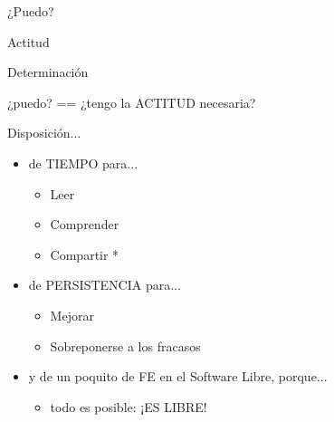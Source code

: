 \documentclass[xcolor=dvipsnames, pdf]{beamer}
\begin{document}
\begin{section}
  {¿Puedo?}
  
  \begin{subsection}
    {Actitud}
    
    \begin{frame}
      {Determinación}
      \begin{center}¿puedo? == ¿tengo la ACTITUD necesaria?\end{center}
    \end{frame}

    \begin{frame}
      {Disposición...}
      
      \begin{itemize}
      \item<2,5> de TIEMPO para...          
        \begin{itemize}
        \item<2,5> Leer
        \item<2,5> Comprender
        \item<2,5> Compartir *
        \end{itemize}

      \item<3,5> de PERSISTENCIA para...        
        \begin{itemize}
        \item<3,5> Mejorar
        \item<3,5> Sobreponerse a los fracasos
        \end{itemize}

      \item<4,5> y de un poquito de FE en el Software Libre, porque...

        \begin{itemize}
        \item<4,5> todo es posible: ¡ES LIBRE!
        \end{itemize}
      \end{itemize}
    \end{frame}
  \end{subsection}
\end{section}
\end{document}
